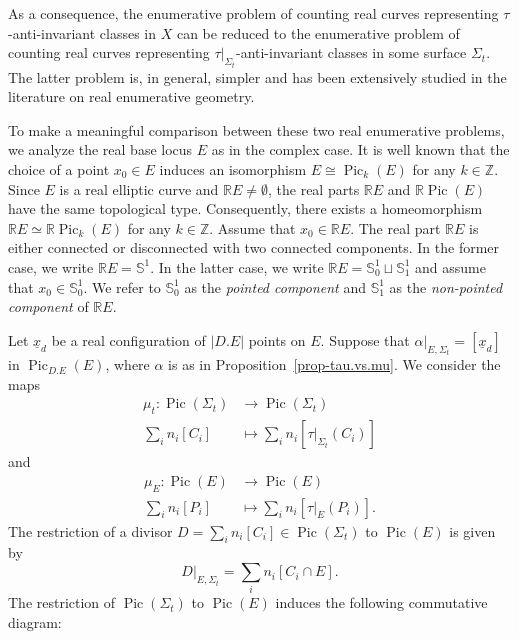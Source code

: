 \documentclass[11pt]{amsart}
\numberwithin{equation}{section}
\theoremstyle{definition}
\theoremstyle{plain}
\theoremstyle{remark}
\newcommand{\R}{\mathbb{R}}
\DeclareMathOperator{\Pic}{Pic}
\newcommand{\lra}{\longrightarrow}
\begin{document}
As a consequence, the enumerative problem of counting real curves representing $\tau$-anti-invariant classes in $X$ can be reduced to the enumerative problem of counting real curves representing $\tau|_{\Sigma_t}$-anti-invariant  classes in some surface $\Sigma_t$. The latter problem is, in general, simpler and has been extensively studied in the literature on real enumerative geometry.

To make a meaningful comparison between these two real enumerative problems, we analyze the real base locus $E$ as in the complex case. It is well known that the choice of a point $x_0\in E$ induces an isomorphism $E\cong \Pic_k(E)$  for any $k\in \mathbb{Z}$. Since $E$ is a real elliptic curve and $\R E\neq \emptyset$, the real parts  $\R E$ and $\R \Pic (E)$ have the same topological type. Consequently, there exists a homeomorphism $\R E \simeq \R \Pic_k(E)$ for any $k\in \mathbb{Z}$. Assume that $x_0\in \R E$. The real part $\R E$ is either connected or disconnected with two connected components. In the former case, we write $\mathbb{R} E =\mathbb{S}^1$. In the latter case, we write $\mathbb{R} E =\mathbb{S}^1_0\sqcup \mathbb{S}^1_1$ and assume that $x_0\in\mathbb{S}^1_0$. We refer to $\mathbb{S}^1_0$ as the \textit{pointed component} and $\mathbb{S}^1_1$ as the \textit{non-pointed component} of $\R E$.

 
 

Let $\underline{x}_{d}$ be a real configuration of $|D.E|$ points on $E$. Suppose that $\alpha|_{E,\Sigma_t}=[\underline{x}_{d}]$ in $\Pic_{D.E}(E)$, where $\alpha$ is as in Proposition~\ref{prop-tau.vs.mu}. 
We consider the  maps
    \begin{align*}
    \mu_t\colon \Pic(\Sigma_t)&\lra \Pic(\Sigma_t)\\
    \sum_i n_i [C_i]&\longmapsto \sum_i n_i \left[\tau|_{\Sigma_t}(C_i)\right]
\end{align*}
and
\begin{align*}
    \mu_E\colon \Pic(E)&\lra \Pic(E)\\
    \sum_i n_i [P_i]&\longmapsto \sum_i n_i \left[\tau|_{E}(P_i)\right].
\end{align*}
The restriction of a divisor $D=\sum_i n_i [C_i]\in \Pic(\Sigma_t)$ to $\Pic(E)$ is given by $$D|_{E,\Sigma_t}=\sum_i n_i [C_i\cap E].$$ 
The restriction of $\Pic(\Sigma_t)$ to $\Pic(E)$ induces the following commutative diagram:
 \begin{center}
        \end{center}
 
\end{document}
